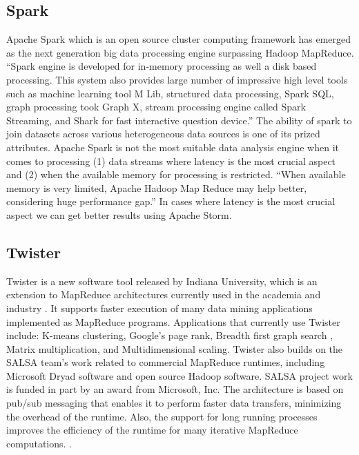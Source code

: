 \subsection{ Spark \cite{www-spark}}

     Apache Spark which is an open source cluster computing framework
     has emerged as the next generation big data processing engine
     surpassing Hadoop MapReduce. ``Spark engine is developed for
     in-memory processing as well a disk based processing. This system
     also provides large number of impressive high level tools such as
     machine learning tool M Lib, structured data processing, Spark
     SQL, graph processing took Graph X, stream processing engine
     called Spark Streaming, and Shark for fast interactive question
     device.'' The ability of spark to join datasets across various
     heterogeneous data sources is one of its prized
     attributes. Apache Spark is not the most suitable data analysis
     engine when it comes to processing (1) data streams where latency
     is the most crucial aspect and (2) when the available memory for
     processing is restricted. ``When available memory is very limited,
     Apache Hadoop Map Reduce may help better, considering huge
     performance gap.'' In cases where latency is the most crucial
     aspect we can get better results using Apache Storm.
     
\subsection{ Twister}

     Twister is a new software tool released by Indiana University,
     which is an extension to MapReduce architectures currently used
     in the academia and industry \cite{www-twister1}. It supports
     faster execution of many data mining applications implemented as
     MapReduce programs. Applications that currently use Twister
     include: K-means clustering, Google's page rank, Breadth first
     graph search , Matrix multiplication, and Multidimensional
     scaling. Twister also builds on the SALSA team's work related to
     commercial MapReduce runtimes, including Microsoft Dryad software
     and open source Hadoop software. SALSA project work is funded in
     part by an award from Microsoft, Inc. The architecture is based
     on pub/sub messaging that enables it to perform faster data
     transfers, minimizing the overhead of the runtime. Also, the
     support for long running processes improves the efficiency of the
     runtime for many iterative MapReduce
     computations. \cite{www-twister2} \cite{www-twister3}
     \cite{paper-twister}.

